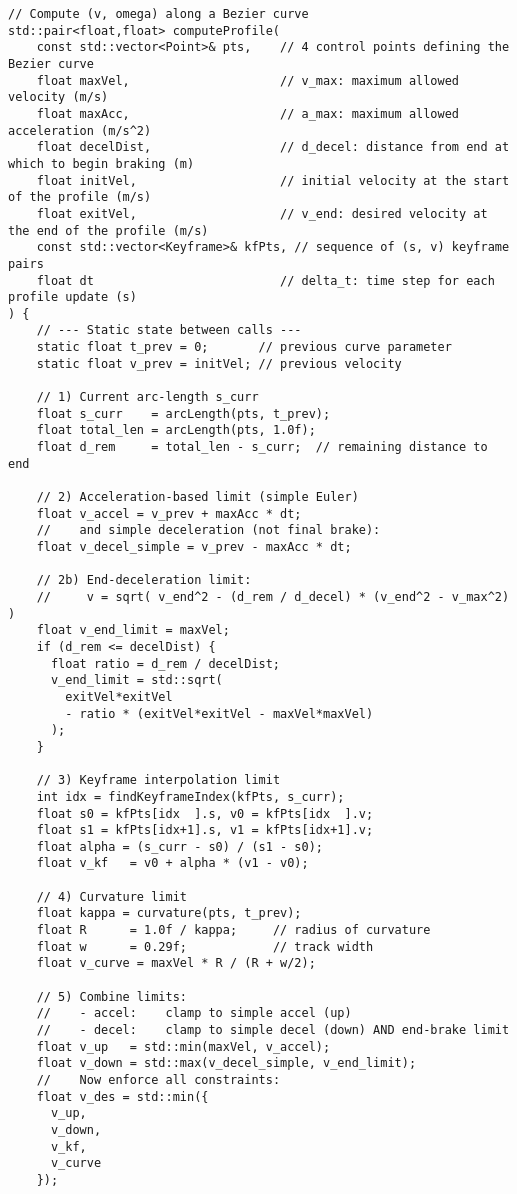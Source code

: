 \documentclass[11pt]{article}
\begin{document}
\begin{lstlisting}
// Compute (v, omega) along a Bezier curve
std::pair<float,float> computeProfile(
    const std::vector<Point>& pts,    // 4 control points defining the Bezier curve
    float maxVel,                     // v_max: maximum allowed velocity (m/s)
    float maxAcc,                     // a_max: maximum allowed acceleration (m/s^2)
    float decelDist,                  // d_decel: distance from end at which to begin braking (m)
    float initVel,                    // initial velocity at the start of the profile (m/s)
    float exitVel,                    // v_end: desired velocity at the end of the profile (m/s)
    const std::vector<Keyframe>& kfPts, // sequence of (s, v) keyframe pairs
    float dt                          // delta_t: time step for each profile update (s)
) {
    // --- Static state between calls ---
    static float t_prev = 0;       // previous curve parameter
    static float v_prev = initVel; // previous velocity

    // 1) Current arc-length s_curr
    float s_curr    = arcLength(pts, t_prev);
    float total_len = arcLength(pts, 1.0f);
    float d_rem     = total_len - s_curr;  // remaining distance to end

    // 2) Acceleration-based limit (simple Euler)
    float v_accel = v_prev + maxAcc * dt;
    //    and simple deceleration (not final brake):
    float v_decel_simple = v_prev - maxAcc * dt;

    // 2b) End-deceleration limit:
    //     v = sqrt( v_end^2 - (d_rem / d_decel) * (v_end^2 - v_max^2) )
    float v_end_limit = maxVel;
    if (d_rem <= decelDist) {
      float ratio = d_rem / decelDist;
      v_end_limit = std::sqrt(
        exitVel*exitVel
        - ratio * (exitVel*exitVel - maxVel*maxVel)
      );
    }

    // 3) Keyframe interpolation limit
    int idx = findKeyframeIndex(kfPts, s_curr);
    float s0 = kfPts[idx  ].s, v0 = kfPts[idx  ].v;
    float s1 = kfPts[idx+1].s, v1 = kfPts[idx+1].v;
    float alpha = (s_curr - s0) / (s1 - s0);
    float v_kf   = v0 + alpha * (v1 - v0);

    // 4) Curvature limit
    float kappa = curvature(pts, t_prev);
    float R      = 1.0f / kappa;     // radius of curvature
    float w      = 0.29f;            // track width
    float v_curve = maxVel * R / (R + w/2);

    // 5) Combine limits:
    //    - accel:    clamp to simple accel (up)
    //    - decel:    clamp to simple decel (down) AND end-brake limit
    float v_up   = std::min(maxVel, v_accel);
    float v_down = std::max(v_decel_simple, v_end_limit);
    //    Now enforce all constraints:
    float v_des = std::min({
      v_up,
      v_down,
      v_kf,
      v_curve
    });


\end{lstlisting}
\end{document}
